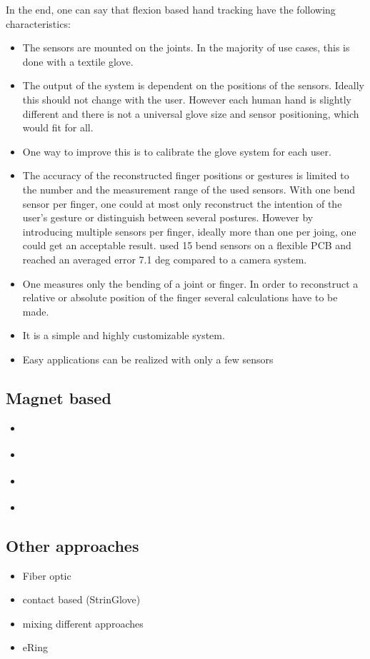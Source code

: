 In the end, one can say that flexion based hand tracking have the following characteristics:\\
\begin{itemize}
\item The sensors are mounted on the joints. In the majority of use cases, this is done with a textile glove. 
\item The output of the system is dependent on the positions of the sensors. Ideally this should not change with the user. However each human hand is slightly different and there is not a universal glove size and sensor positioning, which would fit for all.
\item One way to improve this is to calibrate the glove system for each user.
\item The accuracy of the reconstructed finger positions or gestures is limited to the number and the measurement range of the used sensors. With one bend sensor per finger, one could at most only reconstruct the intention of the user's gesture or distinguish between several postures. However by introducing multiple sensors per finger, ideally more than one per joing, one could get an acceptable result. \cite{zecca2007development} used 15 bend sensors on a flexible PCB and reached an averaged error 7.1 deg  compared to a camera system.
\item One measures only the bending of a joint or finger. In order to reconstruct a relative or absolute position of the finger several calculations have to be made.
\item It is a simple and highly customizable system.
\item Easy applications can be realized with only a few sensors 
\end{itemize}


\subsection{Magnet based}
\begin{itemize}
\item \cite{ma2011magnetic}
\item \cite{ma2010magnetic}
\item \cite{hashi2006wireless}
\item \cite{ekvall2005grasp}
\end{itemize}

\subsection{Other approaches}
\begin{itemize}
\item Fiber optic \cite{dipietro2003evaluation}
\item contact based (StrinGlove)
\item mixing different approaches
\item eRing \cite{wilhelm2015ering}
\end{itemize}


